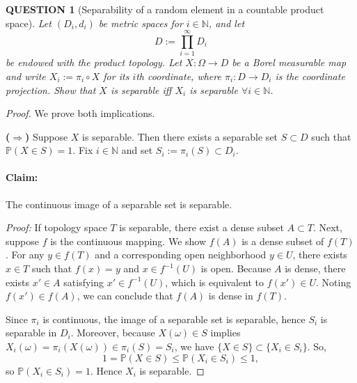 \documentclass[12pt]{article}
\renewcommand{\(}{\left(}%
\renewcommand{\)}{\right)}%
\renewcommand{\[}{\left[}%
\renewcommand{\]}{\right]}%
\newtheorem{question}{QUESTION}[section]}
\newtheorem{proof}{Proof.}}
\begin{document}
\begin{question}[Separability of a random element in a countable product space]
Let $(D_i,d_i)$ be metric spaces for $i\in\mathbb N$, and let
\begin{equation*}
D := \prod_{i=1}^\infty D_i
\end{equation*}
be endowed with the product topology. Let $X:\Omega\to D$ be a Borel measurable
map and write $X_i := \pi_i\circ X$ for its $i$th coordinate, where
$\pi_i:D\to D_i$ is the coordinate projection. Show that $X$ is separable iff $X_i$ is separable $\forall i\in\mathbb N$.
\end{question}

\begin{proof}
We prove both implications.

\medskip
\noindent
\textbf{($\Rightarrow$)} Suppose $X$ is separable. Then there exists a separable set
$S\subset D$ such that $\mathbb P(X\in S)=1$. Fix $i\in\mathbb N$ and set $S_i := \pi_i(S)\subset D_i.$
\paragraph{Claim:} The continuous image of a separable set is separable. 

{\itshape Proof:} If topology space $T$ is separable, there exist a dense subset $A\subset T$. Next, suppose $f$ is the continuous mapping. We show $f(A)$ is a dense subset of $f(T)$. For any $y\in f(T)$ and a corresponding open neighborhood $y\in U$, there exists $x\in T$ such that $f(x)=y$ and $x\in f^{-1}(U)$ is open. Because $A$ is dense, there exists $x'\in A$ satisfying $x'\in f^{-1}(U)$, which is equivalent to $f(x')\in U$. Noting $f(x')\in f(A)$, we can conclude that $f(A)$ is dense in $f(T)$.  

Since $\pi_i$ is continuous, the image of a separable set is separable, hence $S_i$
is separable in $D_i$. Moreover, because $X(\omega)\in S$ implies $X_i(\omega)=\pi_i(X(\omega))\in \pi_i(S)=S_i$, we have $\{X\in S\}\subset \{X_i\in S_i\}$. So,
\begin{equation*}
1=\mathbb P(X\in S)\le \mathbb P(X_i\in S_i)\le 1,
\end{equation*}
so $\mathbb P(X_i\in S_i)=1$. Hence $X_i$ is separable.


\end{proof}
\end{document}
